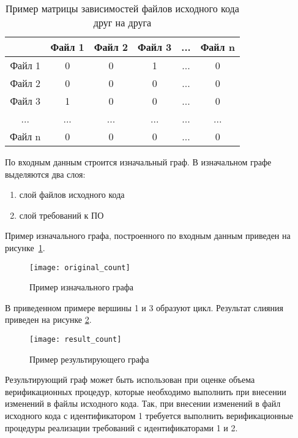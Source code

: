\begin{longtable}{|c|c|c|c|c|c|}
\caption{Пример матрицы зависимостей файлов исходного кода друг на друга}
\label{tab:dependency_matrix}\\
\hline
& \cellcolor{platinum} Файл 1 
& \cellcolor{platinum} Файл 2 
& \cellcolor{platinum} Файл 3 
& ... 
& \cellcolor{platinum} Файл n \\
\hline
\cellcolor{platinum} Файл 1 & 0 & 0 & \cellcolor{light-blue} 1 & ... & 0 \\
\hline
\cellcolor{platinum} Файл 2 & 0 & 0 & 0 & ... & 0 \\
\hline
\cellcolor{platinum} Файл 3 & \cellcolor{mauve} 1 & 0 & 0 & ... & 0 \\
\hline
... & ... & ... & ... & ... & ... \\
\hline
\cellcolor{platinum} Файл n & 0 & 0 & 0 & ... & 0 \\
\hline
\end{longtable}




По входным данным строится изначальный граф. В изначальном графе выделяются два слоя:
\begin{enumerate}
    \item слой файлов исходного кода
    \item слой требований к ПО
\end{enumerate}

Пример изначального графа, построенного по входным данным приведен на рисунке~\ref{fig:original_count}.

\begin{figure}[H]
    \centering
    \texttt{[image: original\_count]}
    \caption{Пример изначального графа}
    \label{fig:original_count}
\end{figure}

В приведенном примере вершины 1 и 3 образуют цикл. Результат слияния приведен на рисунке \ref{fig:result_count}.

\begin{figure}[H]
    \centering
    \texttt{[image: result\_count]}
    \caption{Пример результирующего графа}
    \label{fig:result_count}
\end{figure}

Результирующий граф может быть использован при оценке объема верификационных процедур, которые необходимо выполнить при внесении изменений в файлы исходного кода. Так, при внесении изменений в файл исходного кода с идентификатором 1 требуется выполнить верификационные процедуры реализации требований с идентификаторами 1 и 2.